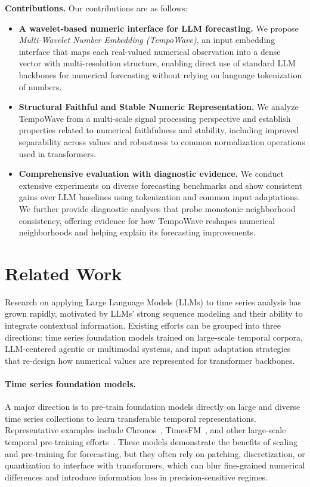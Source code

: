 \documentclass{article}
\begin{document}
\textbf{Contributions.}
Our contributions are as follows:
\begin{itemize}
    \item \textbf{A wavelet-based numeric interface for LLM forecasting.}
    We propose \emph{Multi-Wavelet Number Embedding (TempoWave)}, an input embedding interface that maps each real-valued numerical observation into a dense vector with multi-resolution structure, enabling direct use of standard LLM backbones for numerical forecasting without relying on language tokenization of numbers.

    \item \textbf{Structural Faithful and Stable Numeric Representation.}
    We analyze TempoWave from a multi-scale signal processing perspective and establish properties related to numerical faithfulness and stability, including improved separability across values and robustness to common normalization operations used in transformers.

    \item \textbf{Comprehensive evaluation with diagnostic evidence.}
    We conduct extensive experiments on diverse forecasting benchmarks and show consistent gains over LLM baselines using tokenization and common input adaptations.  We further provide diagnostic analyses that probe {monotonic neighborhood consistency}, offering evidence for how TempoWave reshapes numerical neighborhoods and helping explain its forecasting improvements.
\end{itemize}



\section{Related Work}
\label{sec:related_work}

Research on applying Large Language Models (LLMs) to time series analysis has grown rapidly, motivated by LLMs' strong sequence modeling and their ability to integrate contextual information. Existing efforts can be grouped into three directions: time series foundation models trained on large-scale temporal corpora, LLM-centered agentic or multimodal systems, and input adaptation strategies that re-design how numerical values are represented for transformer backbones.

\paragraph{Time series foundation models.}
A major direction is to pre-train foundation models directly on large and diverse time series collections to learn transferable temporal representations. Representative examples include Chronos~\cite{ansari2024chronos}, TimesFM~\cite{das2024decoder}, and other large-scale temporal pre-training efforts~\cite{woo2024moirai,cao2024timedit,yang2025foundation}. These models demonstrate the benefits of scaling and pre-training for forecasting, but they often rely on patching, discretization, or quantization to interface with transformers, which can blur fine-grained numerical differences and introduce information loss in precision-sensitive regimes.
\end{document}
